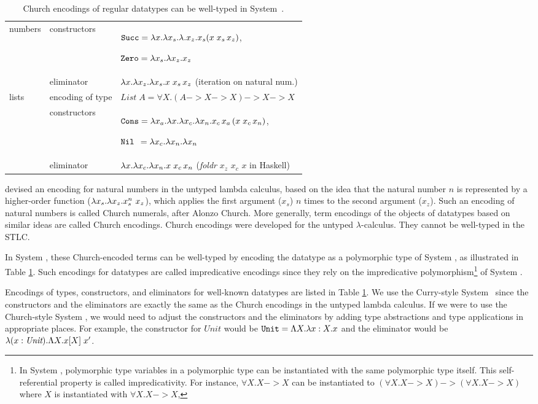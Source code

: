 \begin{table}
\begin{tabular}{p{15mm}|lp{92mm}}
numbers
& constructors          & $\mathtt{Succ} = \lambda x. \lambda x_s. \lambda. x_z. x_s (x\;x_s\,x_z)$,\par
                        $\mathtt{Zero} = \lambda x_s. \lambda x_z. x_z$ \\
& eliminator            & $\lambda x.\lambda x_z. \lambda x_s.x\;x_s\,x_z$ \quad
                        (iteration on natural num.)
        \\\hline
lists
& encoding of type      & $\textit{List}\;A = \forall X. (A -> X -> X) -> X -> X$ \\
& constructors          & $\mathtt{Cons} = \lambda x_a.\lambda x.\lambda x_c.\lambda x_n. x_c\,x_a\,(x\;x_c\,x_n)$,\par
                        $\mathtt{Nil}\;\, = \lambda x_c.\lambda x_n.\lambda x_n$ \\
& eliminator            & $\lambda x.\lambda x_c. \lambda x_n.x\;x_c\,x_n$ \quad
                        (\textit{foldr} $x_z$ $x_c$ $x$ in Haskell)
        \\\hline
\end{tabular}
\caption{Church encodings of regular datatypes can be well-typed in System~\F.}
\label{tbl:dataF}
\end{table}

\citet{Church41} devised an encoding for natural numbers
in the untyped lambda calculus, based on the idea that the natural number $n$
is represented by a higher-order function ($\lambda x_s.\lambda x_z.x_s^n~x_z$), which
applies the first argument ($x_s$) $n$ times to the second argument ($x_z$).
Such an encoding of natural numbers is called Church numerals, after
Alonzo Church. More generally, term encodings of the objects of datatypes
based on similar ideas are called Church encodings. Church encodings were
developed for the untyped $\lambda$-calculus. They cannot be 
well-typed in the STLC.

In System \F,
these Church-encoded terms can be well-typed by encoding the datatype
as a polymorphic type of System \F, as illustrated in Table \ref{tbl:dataF}.
Such encodings for datatypes are called impredicative encodings
since they rely on the impredicative polymorphism\footnote{
	In System \F, polymorphic type variables in a polymorphic type can be
	instantiated with the same polymorphic type itself.
	This self-referential property is called impredicativity.
	For instance, $\forall X.X -> X$ can be instantiated to
	$(\forall X.X -> X) -> (\forall X.X -> X)$ where $X$ is
	instantiated with $\forall X.X -> X$,
	} of System \F.

Encodings of types, constructors, and eliminators for
well-known datatypes are listed in Table \ref{tbl:dataF}.
We use the Curry-style System \F\ since the constructors and the eliminators
are exactly the same as the Church encodings in the untyped lambda calculus.
If we were to use the Church-style System \F, we would need to adjust
the constructors and the eliminators by adding type abstractions and
type applications in appropriate places. For example,
the constructor for $\textit{Unit}$ would be
$\mathtt{Unit} = \Lambda X.\lambda x:X.x$ and the eliminator would be
$\lambda(x:\textit{Unit}).\Lambda X.x[X]\;x'$.

